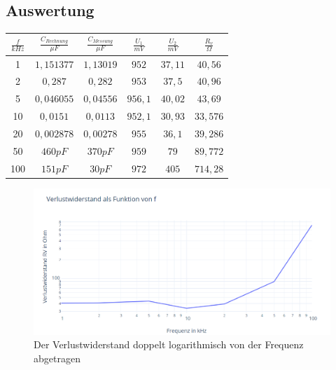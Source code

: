 \documentclass{article}
\begin{document}
\subsection{Auswertung}
\begin{center}

  \begin{tabular}{|c|c|c|c|c|c|}
    \hline
    $\frac{f}{kHz}$ & $\frac{C_{Rechnung}}{\mu F}$ & $\frac{C_{Messung}}{\mu F}$ & $\frac{U_1}{mV}$ & $\frac{U_2}{mV}$ & $\frac{R_v}{\Omega}$ \\
    \hline
    1               & $1,151377$                   & $1,13019$                   & $952$            & $37,11$          &     $40,56$                 \\
    \hline
    2               & $0,287$                      & $0,282$                     & $953$            & $37,5$           &       $40,96$               \\
    \hline
    5               & $0,046055$                   & $0,04556$                   & $956,1$          & $40,02$          &        $43,69$              \\
    \hline
    10              & $0,0151$                     & $0,0113$                    & $952,1$          & $30,93$          &       $33,576$               \\
    \hline
    20              & $0,002878$                   & $0,00278$                   & $955$            & $36,1$           &        $39,286$              \\
    \hline
    50              & $460pF$                      & $370pF$                     & $959$            & $79$             &         $89,772$             \\
    \hline
    100             & $151pF$                      & $30pF$                      & $972$            & $405$            &          $714,28$            \\
    \hline
  \end{tabular}
\end{center}
\begin{figure}[h]
  \begin{center}
    \includegraphics[scale=0.75]{assets/images/Plot.PNG}
    \caption{Der Verlustwiderstand doppelt logarithmisch von der Frequenz abgetragen}
  \end{center}
\end{figure}
\newpage
\begin{figure}

\end{figure}
\end{document}
